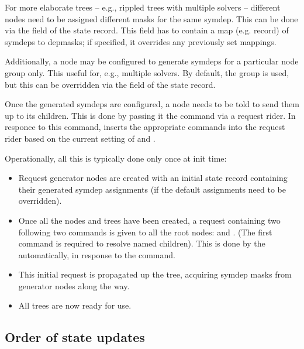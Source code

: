   For more elaborate trees -- e.g., rippled trees with multiple solvers --
  different  nodes need to be assigned different masks for the same
  symdep. This can be done via the  field of the state record.
  This field has to contain a map (e.g. record) of symdeps to depmasks; if
  specified, it overrides any previously set mappings. 

  Additionally, a node may be configured to generate symdeps for a particular
  node group only. This useful for, e.g., multiple solvers. By default, the
   group is used, but this can be overridden via the
   field of the state record.

  Once the generated symdeps are configured, a node needs to be told to send
  them up to its children. This is done by passing it the 
  command via a request rider. In responce to this command,
   inserts the appropriate  commands
  into the request rider based on the current setting of  and
  .

  Operationally, all this is typically done only once at init time:
  
  \begin{itemize}
  
  \item Request generator nodes are created with an initial state record
    containing their generated symdep assignments (if the default assignments
    need to be overridden).
    
  \item Once all the nodes and trees have been created, a request containing
    two following two commands is given to all the root nodes:
     and . (The first command is
    required to resolve named children). This is done by the 
    automatically, in response to the  command.

  \item This initial request is propagated up the tree, acquiring symdep masks
    from generator nodes along the way. 
    
  \item All trees are now ready for use.
  
  \end{itemize}

\subsection{Order of state updates}

